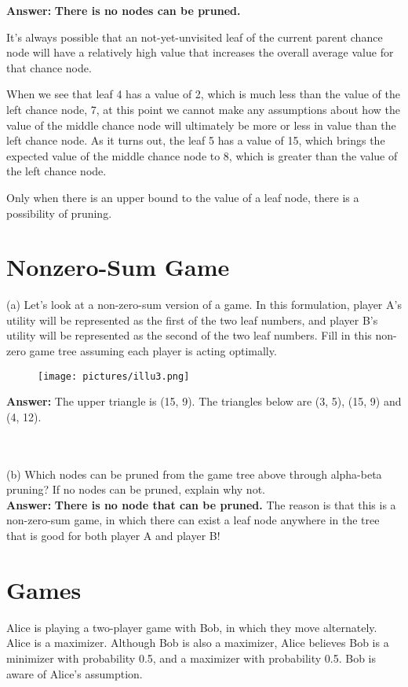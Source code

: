 \documentclass{article}
\begin{document}
\textbf{Answer:} \textbf{There is no nodes can be pruned.}

It's always possible that an not-yet-unvisited leaf of the current parent chance node will have a relatively high value that increases the overall average value for that chance node. 

When we see that leaf 4 has a value of 2, which is much less than the value of the left chance node, 7, at this point we cannot make any assumptions about how the value of the middle chance node will ultimately be more or less in value than the left chance node. As it turns out, the leaf 5 has a value of 15, which brings the expected value of the middle chance node to 8, which is greater than the value of the left chance node. 

Only when there is an upper bound to the value of a leaf node, there is a possibility of pruning.

\newpage
\section{Nonzero-Sum Game}
\noindent (a) Let’s look at a non-zero-sum version of a game. In this formulation, player A’s utility will be represented as the first of the two leaf numbers, and player B’s utility will be represented as the second of the two leaf numbers. Fill in this non-zero game tree assuming each player is acting optimally.

\begin{figure}[h]
\centering
\texttt{[image: pictures/illu3.png]}
\end{figure}

\textbf{Answer:} The upper triangle is (15, 9). The triangles below are (3, 5), (15, 9) and (4, 12).

~\\
~\\
\noindent (b) Which nodes can be pruned from the game tree above through alpha-beta pruning? If no nodes can be pruned, explain why not. \\

\textbf{Answer:} \textbf{There is no node that can be pruned.} The reason is that  this is a non-zero-sum game, in which there can exist a leaf node anywhere in the tree that is good for both player A and player B!


\newpage
\section{Games}
\noindent Alice is playing a two-player game with Bob, in which they move alternately. Alice is a maximizer. Although Bob is also a maximizer, Alice believes Bob is a minimizer with probability 0.5, and a maximizer with probability 0.5. Bob is aware of Alice’s assumption.
\end{document}
